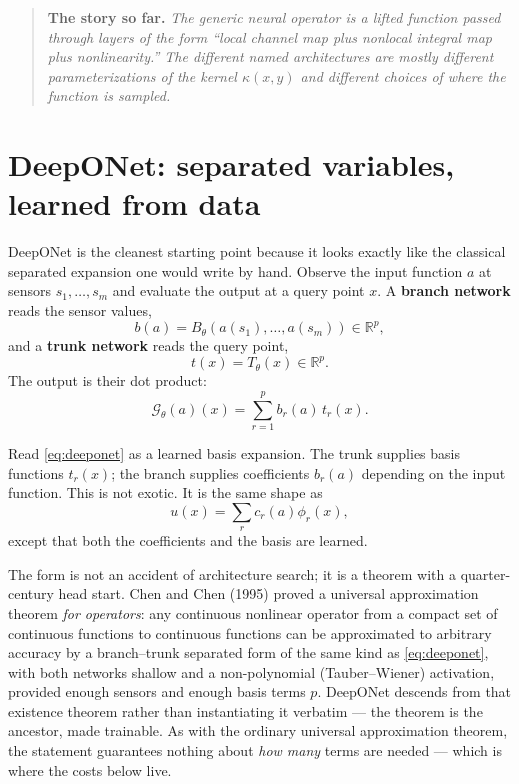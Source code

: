 \documentclass[10pt,a4paper]{article}
\newenvironment{recap}
{\par\medskip\noindent\begin{quote}\small\textbf{The story so far.}\itshape\;}
{\end{quote}\medskip}
\newcommand{\R}{\mathbb{R}}
\newcommand{\G}{\mathcal{G}}
\begin{document}
\begin{recap}
The generic neural operator is a lifted function passed through layers of the
form ``local channel map plus nonlocal integral map plus nonlinearity.'' The
different named architectures are mostly different parameterizations of the
kernel $\kappa(x,y)$ and different choices of where the function is sampled.
\end{recap}

\section{DeepONet: separated variables, learned from data}
\label{sec:deeponet}

DeepONet is the cleanest starting point because it looks exactly like the
classical separated expansion one would write by hand. Observe the input
function $a$ at sensors $s_1,\ldots,s_m$ and evaluate the output at a query
point $x$. A \textbf{branch network} reads the sensor values,
\[
  b(a) = B_\theta(a(s_1),\ldots,a(s_m)) \in \R^p,
\]
and a \textbf{trunk network} reads the query point,
\[
  t(x) = T_\theta(x) \in \R^p.
\]
The output is their dot product:
\begin{equation}
  \G_\theta(a)(x)
  = \sum_{r=1}^p b_r(a)\,t_r(x).
\label{eq:deeponet}
\end{equation}

Read \eqref{eq:deeponet} as a learned basis expansion. The trunk supplies
basis functions $t_r(x)$; the branch supplies coefficients $b_r(a)$ depending
on the input function. This is not exotic. It is the same shape as
\[
  u(x) = \sum_r c_r(a)\phi_r(x),
\]
except that both the coefficients and the basis are learned.

The form is not an accident of architecture search; it is a theorem with a
quarter-century head start. Chen and Chen (1995) proved a universal
approximation theorem \emph{for operators}: any continuous nonlinear
operator from a compact set of continuous functions to continuous
functions can be approximated to arbitrary
accuracy by a branch--trunk separated form of the same kind as
\eqref{eq:deeponet}, with both
networks shallow and a non-polynomial (Tauber--Wiener) activation,
provided enough sensors and enough basis terms $p$.
DeepONet descends from that existence theorem rather than instantiating
it verbatim --- the theorem is the ancestor, made trainable. As with the
ordinary
universal approximation theorem, the statement guarantees nothing about
\emph{how many} terms are needed --- which is where the costs below live.
\end{document}
